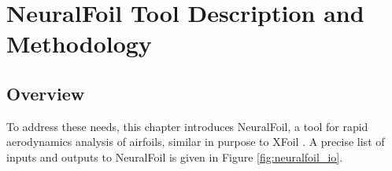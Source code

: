 \section{NeuralFoil Tool Description and Methodology}
\label{sec:methodology}

\subsection{Overview}


To address these needs, this chapter introduces NeuralFoil, a tool for rapid aerodynamics analysis of airfoils, similar in purpose to XFoil \cite{drela_xfoil_1989}. A precise list of inputs and outputs to NeuralFoil is given in Figure \ref{fig:neuralfoil_io}.

